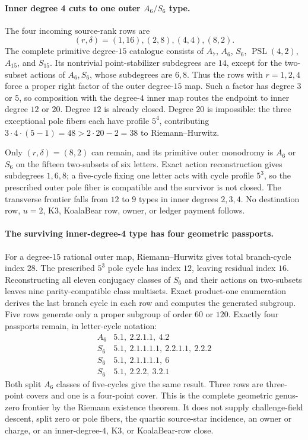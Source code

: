 \documentclass[11pt]{article}
\begin{document}
\paragraph{Inner degree 4 cuts to one outer \(A_6/S_6\) type.}
The four incoming source-rank rows are
\[
  (r,\delta)=(1,16),(2,8),(4,4),(8,2).
\]
The complete primitive degree-\(15\) catalogue consists of \(A_7\),
\(A_6\), \(S_6\), \(\operatorname{PSL}(4,2)\), \(A_{15}\), and
\(S_{15}\).  Its nontrivial point-stabilizer subdegrees are \(14\), except
for the two-subset actions of \(A_6,S_6\), whose subdegrees are \(6,8\).
Thus the rows with \(r=1,2,4\) force a proper right factor of the outer
degree-\(15\) map.  Such a factor has degree \(3\) or \(5\), so composition
with the degree-\(4\) inner map routes the endpoint to inner degree \(12\)
or \(20\).  Degree \(12\) is already closed.  Degree \(20\) is impossible:
the three exceptional pole fibers each have profile \(5^4\), contributing
\(3\cdot4\cdot(5-1)=48>2\cdot20-2=38\) to Riemann--Hurwitz.

Only \((r,\delta)=(8,2)\) can remain, and its primitive outer monodromy is
\(A_6\) or \(S_6\) on the fifteen two-subsets of six letters.  Exact action
reconstruction gives subdegrees \(1,6,8\); a five-cycle fixing one letter
acts with cycle profile \(5^3\), so the prescribed outer pole fiber is
compatible and the survivor is not closed.  The transverse frontier falls
from \(12\) to \(9\) types in inner degrees \(2,3,4\).  No destination row,
\(u=2\), K3, KoalaBear row, owner, or ledger payment follows.

\paragraph{The surviving inner-degree-4 type has four geometric passports.}
For a degree-\(15\) rational outer map, Riemann--Hurwitz gives total
branch-cycle index \(28\).  The prescribed \(5^3\) pole cycle has index
\(12\), leaving residual index \(16\).  Reconstructing all eleven
conjugacy classes of \(S_6\) and their actions on two-subsets leaves nine
parity-compatible class multisets.  Exact product-one enumeration derives
the last branch cycle in each row and computes the generated subgroup.
Five rows generate only a proper subgroup of order \(60\) or \(120\).
Exactly four passports remain, in letter-cycle notation:
\[
\begin{array}{c|l}
A_6 & 5.1,\ 2.2.1.1,\ 4.2\\
S_6 & 5.1,\ 2.1.1.1.1,\ 2.2.1.1,\ 2.2.2\\
S_6 & 5.1,\ 2.1.1.1.1,\ 6\\
S_6 & 5.1,\ 2.2.2,\ 3.2.1
\end{array}
\]
Both split \(A_6\) classes of five-cycles give the same result.  Three rows
are three-point covers and one is a four-point cover.  This is the complete
geometric genus-zero frontier by the Riemann existence theorem.  It does not
supply challenge-field descent, split zero or pole fibers, the quartic
source-star incidence, an owner or charge, or an inner-degree-\(4\), K3, or
KoalaBear-row close.
\end{document}
